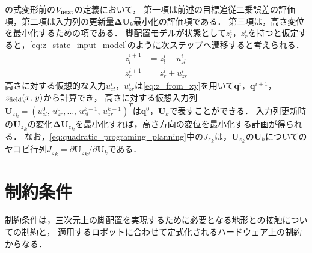 \documentclass[autodetect-engine,dvipdfmx-if-dvi,ja=standard,a4j,jbase=11pt,magstyle=nomag*]{bxjsreport}
\begin{document}
の式変形前の$V_{\mathrm{next}}$の定義において，
第一項は前述の目標追従二乗誤差の評価項，第二項は入力列の更新量$\bm{\Delta U}_k$最小化の評価項である．
第三項は，高さ変位を最小化するための項である．
脚配置モデルが状態として$z_l^i$，$z_r^i$を持つと仮定すると，\cref{eq:z_state_input_model}のように次ステップへ遷移すると考えられる．
\begin{equation} \label{eq:z_state_input_model}
    \begin{aligned}
        z_l^{i + 1} & = z_l^i + u_{zl}^i \\
        z_r^{i + 1} & = z_r^i + u_{zr}^i
    \end{aligned}
\end{equation}
高さに対する仮想的な入力$u_{zl}^i$，$u_{zr}^i$は\cref{eq:z_from_xy}を用いて$\bm{q}^i$，$\bm{q}^{i + 1}$，$z_{\mathrm{field}} ( x ,\, y )$から計算でき，
高さに対する仮想入力列${\bm{U}_z}_k = ( u_{zl}^0 ,\, u_{zr}^0 , \dots ,\, u_{zl}^{k - 1} ,\, u_{zr}^{k - 1} )^T$は$\bm{q}^0$，$\bm{U}_k$で表すことができる．
入力列更新時の${\bm{U}_z}_k$の変化${\bm{\Delta U}_z}_k$を最小化すれば，高さ方向の変位を最小化する計画が得られる．
なお，\cref{eq:quadratic_programing_planning}中の${J_z}_k$は，${\bm{U}_z}_k$の$\bm{U}_k$についての
ヤコビ行列${J_z}_k = \partial {\bm{U}_z}_k / \partial \bm{U}_k$である．


\section{制約条件}
\label{seq:constraints}
制約条件は，三次元上の脚配置を実現するために必要となる地形との接触についての制約と，
適用するロボットに合わせて定式化されるハードウェア上の制約からなる．
\end{document}
